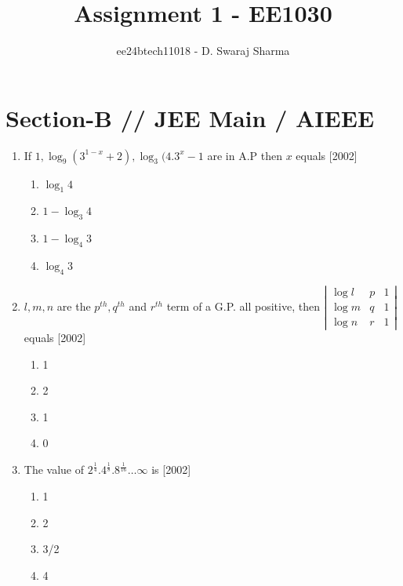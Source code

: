 \documentclass[journal,12pt,twocolumn]{IEEEtran}
\theoremstyle{remark}
\begin{document}

\vspace{3cm}

\title{Assignment 1 - EE1030}
\author{ee24btech11018 - D. Swaraj Sharma}
\maketitle
\newpage
\bigskip

\renewcommand{\thefigure}{\theenumi}
\renewcommand{\thetable}{\theenumi}

\section*{\textbf{Section-B} // \textbf{JEE Main} / \textbf{AIEEE}}

\begin{enumerate}[label={\arabic*.}]


\item {If $ 1, \log_9 (3^{1-x} +2), \log_3 (4.3^x -1$ are in A.P then $x$ equals}
{\hfill{[2002]}}
\begin{enumerate}[label={(\alph*)}]
\item  {$\log_1 4$}
 \item {$1-\log_3 4$}
 \item {$1-\log_4 3$}
 \item {$\log_4 3$}
\end{enumerate}
\item {$l, m, n$ are the $p^{th}, q^{th}$ and $r^{th}$ term of a G.P. all positive, then $\left|\begin{matrix} \log l & p & 1 \\ \log m & q & 1 \\ \log n & r & 1 \end{matrix}\right|$ equals}
{\hfill{[2002]}} 
\begin{enumerate}[label={(\alph*)}]
\item{1}
\item{2}
\item{1}
\item{0}
\end{enumerate}

\item {The value of $2^{\frac{1}{4}} . 4^{\frac{1}{8}} . 8^{\frac{1}{16}} \ldots \infty$ is}
{\hfill{[2002]}} 
\begin{enumerate}[label={(\alph*)}]
\item  {1}
\item  {2}
\item  {3/2}
\item  {4}
\end{enumerate}


\end{enumerate}
\end{document}
